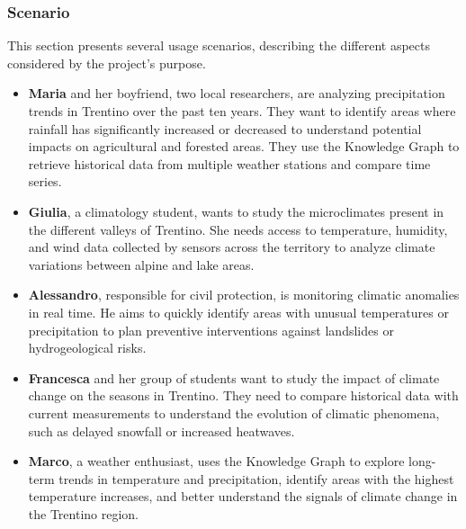 \subsubsection{Scenario}
This section presents several usage scenarios, describing the different aspects considered by the project’s purpose.
\begin{itemize}
    \item \textbf{Maria} and her boyfriend, two local researchers, are analyzing precipitation trends in Trentino over the past ten years. They want to identify areas where rainfall has significantly increased or decreased to understand potential impacts on agricultural and forested areas. They use the Knowledge Graph to retrieve historical data from multiple weather stations and compare time series.
    \item \textbf{Giulia}, a climatology student, wants to study the microclimates present in the different valleys of Trentino. She needs access to temperature, humidity, and wind data collected by sensors across the territory to analyze climate variations between alpine and lake areas.
    \item \textbf{Alessandro}, responsible for civil protection, is monitoring climatic anomalies in real time. He aims to quickly identify areas with unusual temperatures or precipitation to plan preventive interventions against landslides or hydrogeological risks.
    \item \textbf{Francesca} and her group of students want to study the impact of climate change on the seasons in Trentino. They need to compare historical data with current measurements to understand the evolution of climatic phenomena, such as delayed snowfall or increased heatwaves.
    \item \textbf{Marco}, a weather enthusiast, uses the Knowledge Graph to explore long-term trends in temperature and precipitation, identify areas with the highest temperature increases, and better understand the signals of climate change in the Trentino region.
\end{itemize}

